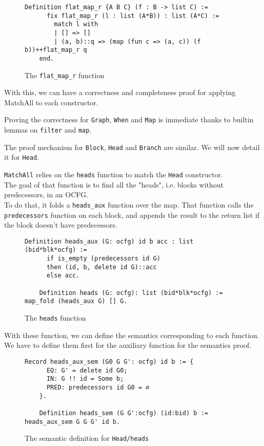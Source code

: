 \documentclass[11pt]{article}
\newcommand{\inlinecoq}[1]{\mbox{\lstinline[style=customcoq,columns=fixed,basewidth=.48em]{#1}}}
\newcommand{\ilc}[1]{\inlinecoq{#1}}
\begin{document}
\begin{figure}[h]
  \label{fig:fmapr}
  \begin{lstlisting}[style=customcoq,basicstyle=\small\ttfamily]
    Definition flat_map_r {A B C} (f : B -> list C) :=
      fix flat_map_r (l : list (A*B)) : list (A*C) :=
        match l with
        | [] => []
        | (a, b)::q => (map (fun c => (a, c)) (f b))++flat_map_r q
    end.
  \end{lstlisting}
  \caption{The \ilc{flat_map_r} function}
\end{figure}

\noindent
With this, we can have a correctness and completeness proof for applying MatchAll to each constructor.

Proving the correctness for \ilc{Graph}, \ilc{When} and \ilc{Map} is immediate thanks to builtin lemmas on \ilc{filter} and \ilc{map}.

The proof mechanism for \ilc{Block}, \ilc{Head} and \ilc{Branch} are similar. We will now detail it for \ilc{Head}.

\ilc{MatchAll} relies on the \ilc{heads} function to match the \ilc{Head} constructor.\\
The goal of that function is to find all the "heads", i.e. blocks without predecessors, in an OCFG.\\
To do that, it folds a \ilc{heads_aux} function over the map. That function calls the \ilc{predecessors} function on each block, and appends the result to the return list if the block doesn't have predecessors.

\begin{figure}[H]
  \begin{lstlisting}[style=customcoq,basicstyle=\small\ttfamily]
    Definition heads_aux (G: ocfg) id b acc : list (bid*blk*ocfg) :=
      if is_empty (predecessors id G)
      then (id, b, delete id G)::acc
      else acc.

    Definition heads (G: ocfg): list (bid*blk*ocfg) := map_fold (heads_aux G) [] G.
  \end{lstlisting}
  \caption{The \ilc{heads} function}
  \label{fig:heads_fun}
\end{figure}

With these function, we can define the semantics corresponding to each function. We have to define them first for the auxiliary function for the semantics proof.

\begin{figure}[H]
  \begin{lstlisting}[style=customcoq,basicstyle=\small\ttfamily]
    Record heads_aux_sem (G0 G G': ocfg) id b := {
      EQ: G' = delete id G0;
      IN: G !! id = Some b;
      PRED: predecessors id G0 = ∅
    }.

    Definition heads_sem (G G':ocfg) (id:bid) b := heads_aux_sem G G G' id b.
  \end{lstlisting}
  \caption{The semantic definition for \ilc{Head/heads}}
  \label{fig:sem_block_def}
\end{figure}
\end{document}
